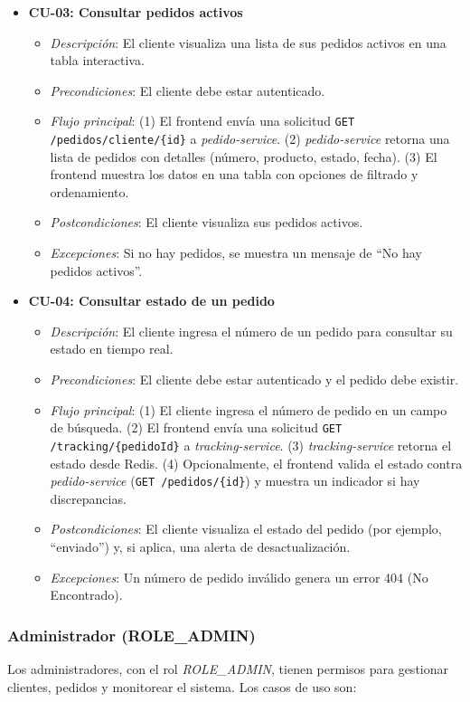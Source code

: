 \documentclass[a4paper,12pt]{article}
\begin{document}
\begin{itemize}
    \item \textbf{CU-03: Consultar pedidos activos}
    \begin{itemize}
        \item \textit{Descripción}: El cliente visualiza una lista de sus pedidos activos en una tabla interactiva.
        \item \textit{Precondiciones}: El cliente debe estar autenticado.
        \item \textit{Flujo principal}: (1) El frontend envía una solicitud \texttt{GET /pedidos/cliente/\{id\}} a \textit{pedido-service}. (2) \textit{pedido-service} retorna una lista de pedidos con detalles (número, producto, estado, fecha). (3) El frontend muestra los datos en una tabla con opciones de filtrado y ordenamiento.
        \item \textit{Postcondiciones}: El cliente visualiza sus pedidos activos.
        \item \textit{Excepciones}: Si no hay pedidos, se muestra un mensaje de ``No hay pedidos activos''.
    \end{itemize}

    \item \textbf{CU-04: Consultar estado de un pedido}
    \begin{itemize}
        \item \textit{Descripción}: El cliente ingresa el número de un pedido para consultar su estado en tiempo real.
        \item \textit{Precondiciones}: El cliente debe estar autenticado y el pedido debe existir.
        \item \textit{Flujo principal}: (1) El cliente ingresa el número de pedido en un campo de búsqueda. (2) El frontend envía una solicitud \texttt{GET /tracking/\{pedidoId\}} a \textit{tracking-service}. (3) \textit{tracking-service} retorna el estado desde Redis. (4) Opcionalmente, el frontend valida el estado contra \textit{pedido-service} (\texttt{GET /pedidos/\{id\}}) y muestra un indicador si hay discrepancias.
        \item \textit{Postcondiciones}: El cliente visualiza el estado del pedido (por ejemplo, ``enviado'') y, si aplica, una alerta de desactualización.
        \item \textit{Excepciones}: Un número de pedido inválido genera un error 404 (No Encontrado).
    \end{itemize}
\end{itemize}

\subsubsection{Administrador (ROLE\_ADMIN)}
Los administradores, con el rol \textit{ROLE\_ADMIN}, tienen permisos para gestionar clientes, pedidos y monitorear el sistema. Los casos de uso son:
\end{document}
